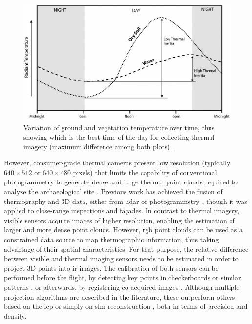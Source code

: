 \begin{figure}[ht]
    \centering
    \includegraphics[width=\linewidth]{figs/castle_puerta_arenas/thermal_exchanging_day.png}
	\caption{Variation of ground and vegetation temperature over time, thus showing which is the best time of the day for collecting thermal imagery (maximum difference among both plots) \cite{casana_archaeological_2017}.}
	\label{fig:thermal_exchanging}
\end{figure}

However, consumer-grade thermal cameras present low resolution (typically $640 \times 512$ or $640 \times 480$ pixels) that limits the capability of conventional photogrammetry to generate dense and large thermal point clouds required to analyze the archaeological site \cite{javadnejad_photogrammetric_2020}. Previous work has achieved the fusion of thermography and 3D data, either from \acrshort{lidar} or photogrammetry \cite{patrucco_3d_2022}, though it was applied to close-range inspections and façades. In contrast to thermal imagery, visible sensors acquire images of higher resolution, enabling the estimation of larger and more dense point clouds. However, \acrshort{rgb} point clouds can be used as a constrained data source to map thermographic information, thus taking advantage of their spatial characteristics. For that purpose, the relative difference between visible and thermal imaging sensors needs to be estimated in order to project 3D points into \acrshort{ir} images. The calibration of both sensors can be performed before the flight, by detecting key points in checkerboards or similar patterns \cite{adan_towards_2020, javadnejad_photogrammetric_2020}, or afterwards, by registering co-acquired images \cite{javadnejad_photogrammetric_2020}. Although multiple projection algorithms are described in the literature, these outperform others based on the \acrshort{icp} \cite{webster_three-dimensional_2018} or simply on \acrshort{sfm} reconstruction \cite{gonzalez_thermal_2019, grechi_3d_2021}, both in terms of precision and density. 






